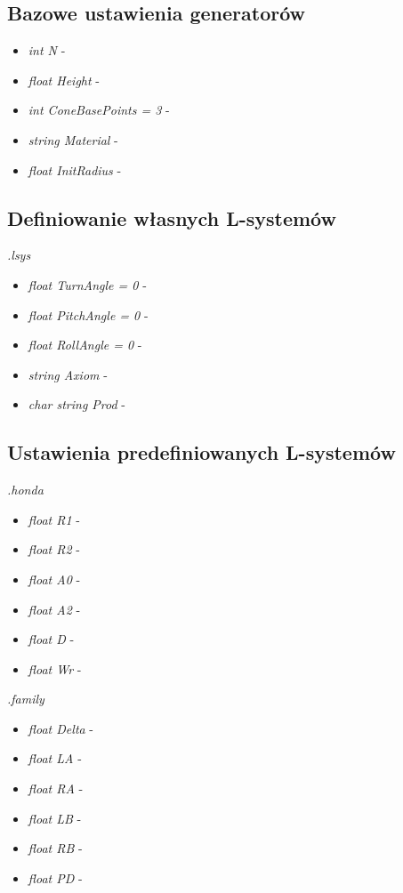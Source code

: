 \documentclass[inz,longabstract]{iithesis}
\begin{document}
        \subsection{Bazowe ustawienia generatorów}
        \begin{itemize}
            \item \textit{int N} -
            \item \textit{float Height} -
            \item \textit{int ConeBasePoints = 3} -
            \item \textit{string Material} -
            \item \textit{float InitRadius} -
        \end{itemize}
        
        \subsection{Definiowanie własnych L-systemów}
        \textit{.lsys}
        \begin{itemize}
            \item \textit{float TurnAngle = 0} -
            \item \textit{float PitchAngle = 0} -
            \item \textit{float RollAngle = 0} -
            \item \textit{string Axiom} -
            \item \textit{char string Prod} -
        \end{itemize}
        
        \subsection{Ustawienia predefiniowanych L-systemów}
        \textit{.honda}
        \begin{itemize}
            \item \textit{float R1} -
            \item \textit{float R2} -
            \item \textit{float A0} -
            \item \textit{float A2} -
            \item \textit{float D} -
            \item \textit{float Wr} -
        \end{itemize}    
        
        \textit{.family}
        \begin{itemize}
            \item \textit{float Delta} -
            \item \textit{float LA} -
            \item \textit{float RA} -
            \item \textit{float LB} -
            \item \textit{float RB} -
            \item \textit{float PD} -
        \end{itemize}    
        
\end{document}
